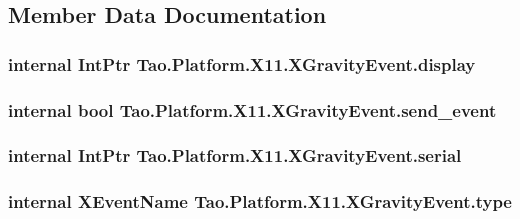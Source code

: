 \subsection{Member Data Documentation}
\hypertarget{struct_tao_1_1_platform_1_1_x11_1_1_x_gravity_event_a18999e1f2c8e2eef34cd6cdea57f6981}{
\subsubsection[{display}]{\setlength{\rightskip}{0pt plus 5cm}internal IntPtr {\bf Tao.Platform.X11.XGravityEvent.display}}}
\label{struct_tao_1_1_platform_1_1_x11_1_1_x_gravity_event_a18999e1f2c8e2eef34cd6cdea57f6981}
\hypertarget{struct_tao_1_1_platform_1_1_x11_1_1_x_gravity_event_aa832e1e784606dd4eedb1fd96b241c6d}{
\subsubsection[{send\_\-event}]{\setlength{\rightskip}{0pt plus 5cm}internal bool {\bf Tao.Platform.X11.XGravityEvent.send\_\-event}}}
\label{struct_tao_1_1_platform_1_1_x11_1_1_x_gravity_event_aa832e1e784606dd4eedb1fd96b241c6d}
\hypertarget{struct_tao_1_1_platform_1_1_x11_1_1_x_gravity_event_aa9199775107e57e7b79e8f68f18573df}{
\subsubsection[{serial}]{\setlength{\rightskip}{0pt plus 5cm}internal IntPtr {\bf Tao.Platform.X11.XGravityEvent.serial}}}
\label{struct_tao_1_1_platform_1_1_x11_1_1_x_gravity_event_aa9199775107e57e7b79e8f68f18573df}
\hypertarget{struct_tao_1_1_platform_1_1_x11_1_1_x_gravity_event_aaede875bd58bcf943a1383d06ad64e41}{
\subsubsection[{type}]{\setlength{\rightskip}{0pt plus 5cm}internal {\bf XEventName} {\bf Tao.Platform.X11.XGravityEvent.type}}}

